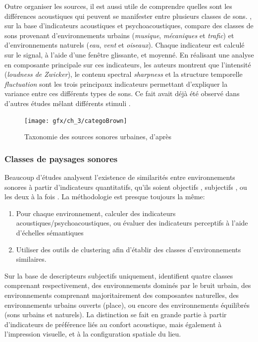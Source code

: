 {{Outre organiser les sources, il est aussi utile de comprendre quelles sont les différences acoustiques qui peuvent se manifester entre plusieurs classes de sons. \citep{yang2013psychoacoustical}, sur la base d'indicateurs acoustiques et psychoacoustiques, compare des classes de sons provenant d'environnements urbains (\emph{musique}, \emph{mécaniques} et \emph{trafic}) et d'environnements naturels (\emph{eau}, \emph{vent} et \emph{oiseaux}). Chaque indicateur est calculé sur le signal, à l'aide d'une fenêtre glissante, et moyenné. En réalisant une analyse en composante principale sur ces indicateurs, les auteurs montrent que l'intensité (\emph{loudness  de Zwicker}), le contenu spectral \emph{sharpness} et la structure temporelle \emph{fluctuation} sont les trois principaux indicateurs permettant d'expliquer la variance entre ces différents types de sons. Ce fait avait déjà été observé dans d'autres études mêlant différents stimuli \citep{de2006quiet,botteldooren2006temporal}.


\begin{figure}[t]
        \myfloatalign
        \texttt{[image: gfx/ch\_3/categoBrown]}
        \caption{Taxonomie des sources sonores urbaines, d'après \citep{brown2011towards}}\label{fig:catSoundscapeBrown}
\end{figure}

\subsubsection{Classes de paysages sonores}
\label{sec:ch3_classePaysage}

Beaucoup d'études analysent l'existence de similarités entre environnements sonores à partir d'indicateurs quantitatifs, qu'ils soient objectifs \citep{rychtarikova2013soundscape}, subjectifs \citep{jeon2013soundwalk}, ou les deux à la fois \citep{torija2013application,ricciardi2015sound}. La méthodologie est presque toujours la même:

\begin{enumerate}
\item Pour chaque environnement, calculer des indicateurs acoustiques/psychoacoustiques, ou évaluer des indicateurs perceptifs à l'aide d'échelles sémantiques
\item Utiliser des outils de clustering afin d'établir des classes d'environnements similaires.
\end{enumerate}

Sur la base de descripteurs subjectifs uniquement, \citep{jeon2013soundwalk} identifient quatre classes comprenant respectivement, des environnements dominés par le bruit urbain, des environnements comprenant majoritairement des composantes naturelles, des environnements urbains ouverts (place), ou encore des environnements équilibrés (sons urbains et naturels). La distinction se fait en grande partie à partir d'indicateurs de préférence liés au confort acoustique, mais également à l'impression visuelle, et à la configuration spatiale du lieu.  

}}
